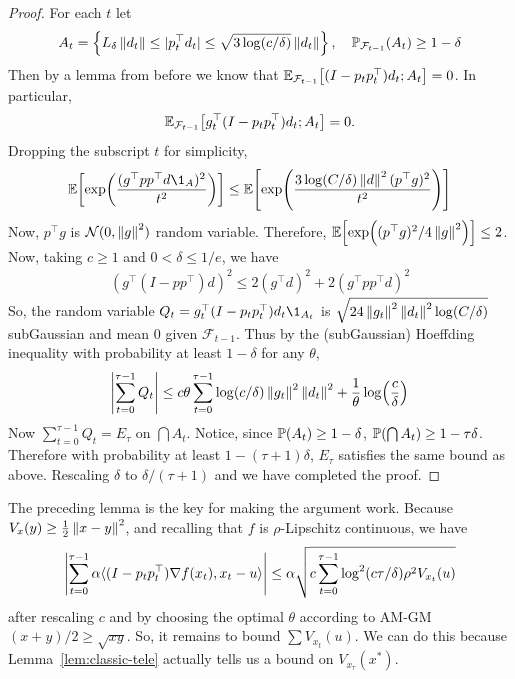     \begin{proof}
        For each $t$ let
        \begin{align*}
            A_t = \set{L_\delta\mg{d_t} \leq |p_t^\top d_t| \leq \sqrt{3 \log(c/\delta)}\mg{d_t}}, \quad \Pt(A_t) \geq 1-\delta
        \end{align*}
        Then by a lemma from before we know that $\Et[(I-p_tp_t^\top) d_t ; A_t] = 0$. In particular,
        \begin{align*}
            \Et[g_t^\top (I-p_tp_t^\top) d_t ; A_t] = 0.
        \end{align*} 
        Dropping the subscript $t$ for simplicity,
        \begin{align*}
            \E[\exp(\frac{(g^\top p p^\top d \1_A)^2}{t^2})] \leq \E[\exp(\frac{3 \log(C/\delta) \mg{d}^2(p^\top g)^2}{t^2})]
        \end{align*}
        Now, $p^\top g$ is $\mathcal N(0, \mg{g}^2)$ random variable. Therefore, $\E[\exp((p^\top g)^2 / 4\mg{g}^2)] \leq 2$. Now, taking $c \geq 1$ and $0 < \delta \leq 1/e$, we have
        \begin{align*}
            (g^\top (I-pp^\top) d)^2 \leq 2(g^\top d)^2 + 2 (g^\top p p^\top d)^2 
        \end{align*} 
        So, the random variable $Q_t = g_t^\top (I-p_tp_t^\top) d_t \1_{A_t}$ is $\sqrt{24\mg{g_t}^2 \mg{d_t}^2 \log(C/\delta)}$ subGaussian and mean 0 given $\mathcal F_{t-1}$. Thus by the  (subGaussian) Hoeffding inequality with probability at least $1-\delta$ for any $\theta$,
        \begin{align*}
            \left |\sum_{t=0}^{\tau-1} Q_t  \right|\leq c \theta \sum_{t=0}^{\tau-1} \log(c/\delta) \mg{g_t}^2 \mg{d_t}^2 + \frac 1 \theta \log(\frac{c}{\delta})
        \end{align*}
        Now $\sum_{t=0}^{\tau-1} Q_t  = E_\tau$ on $\bigcap A_t$. Notice, since $\P(A_t) \geq 1-\delta$, $\P(\bigcap A_t) \geq 1-\tau \delta$. Therefore with probability at least $1-(\tau+1) \delta$, $E_\tau$ satisfies the same bound as above. Rescaling $\delta$ to $\delta/(\tau+1)$ and we have completed the proof.
    \end{proof}
    The preceding lemma is the key for making the argument work. Because $V_x(y) \geq \frac 12 \mg{x-y}^2$, and recalling that $f$ is $\rho$-Lipschitz continuous, we have
    \begin{align*}
        \left|\sum_{t=0}^{\tau-1} \alpha \langle (I-p_tp_t^\top) \grad f(x_t), x_t - u \rangle \right| \leq \alpha\sqrt{c \sum_{t=0}^{\tau-1} \log^2(c\tau/\delta) \rho^2 V_{x_t}(u)}
    \end{align*}
    after rescaling $c$ and by choosing the optimal $\theta$ according to AM-GM $(x+y)/2 \geq \sqrt{xy}$. So, it remains to bound $\sum V_{x_t}(u)$. We can do this because Lemma~\ref{lem:classic-tele} actually tells us a bound on $V_{x_\tau}(x^*)$. 

